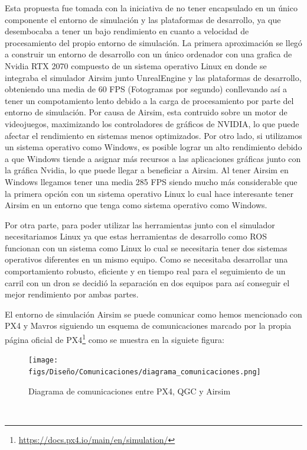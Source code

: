 Esta propuesta fue tomada con la iniciativa de no tener encapsulado en un único componente el entorno de simulación y las plataformas de desarrollo, ya que desembocaba a tener un 
bajo rendimiento en cuanto a velocidad de procesamiento del propio entorno de simulación. La primera aproximación se llegó a construir un entorno de desarrollo con un único ordenador con una grafica
de Nvidia RTX 2070 compuesto de un sistema operativo Linux en donde se integraba el simulador Airsim junto UnrealEngine y las plataformas de desarrollo, obteniendo una media de 60 FPS (Fotogramas por segundo)
conllevando así a tener un compotamiento lento debido a la carga de procesamiento por parte del entorno de simulación. Por causa de Airsim, esta contruido sobre un motor de videojuegos, maximizando los controladores
de gráficos de NVIDIA, lo que puede afectar el rendimiento en sistemas menos optimizados. Por otro lado, si utilizamos un sistema operativo como Windows, es posible lograr un alto rendimiento debido a que Windows
tiende a asignar más recursos a las aplicaciones gráficas junto con la gráfica Nvidia, lo que puede llegar a beneficiar a Airsim. Al tener Airsim en Windows llegamos tener una media 285 FPS siendo
mucho más considerable que la primera opción con un sistema operativo Linux lo cual hace interesante tener Airsim en un entorno que tenga como sistema operativo como Windows. \newline

Por otra parte, para poder utilizar las herramientas junto con el simulador necesitariamos Linux ya que estas herramientas de desarrollo como ROS funcionan con un sistema como Linux lo cual se necesitaria 
tener dos sistemas operativos diferentes en un mismo equipo. Como se necesitaba desarrollar una comportamiento robusto, eficiente y en tiempo real para el seguimiento de un carril con un dron se decidió
la separación en dos equipos para así conseguir el mejor rendimiento por ambas partes. \newline

El entorno de simulación Airsim se puede comunicar como hemos mencionado con PX4 y Mavros siguiendo un esquema de comunicaciones marcado por la propia página oficial de 
PX4\footnote{\url{https://docs.px4.io/main/en/simulation/}} como se muestra en la siguiete figura:

\begin{figure} [H]
  \begin{center}
    \texttt{[image: figs/Diseño/Comunicaciones/diagrama\_comunicaciones.png]}
  \end{center}
  \caption{Diagrama de comunicaciones entre PX4, QGC y Airsim}
  \label{fig:diagramapx4}
\end{figure}\

